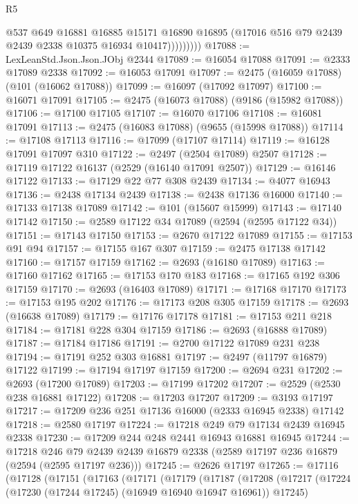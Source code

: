 \begin{lexlean}{R5}
\begin{coremodule}
                    @537
                    @649
                    @16881
                    @16885
                    @15171
                    @16890
                    @16895
                    (@17016 @516 @79 @2439 @2439 @2338 @10375 @16934 @10417)))))))))
@17088 := LexLeanStd.Json.Json.JObj @2344
@17089 := @16054 @17088
@17091 := @2333 @17089 @2338
@17092 := @16053 @17091
@17097 := @2475 (@16059 @17088) (@101 (@16062 @17088))
@17099 := @16097 (@17092 @17097)
@17100 := @16071 @17091
@17105 := @2475 (@16073 @17088) (@9186 (@15982 @17088))
@17106 := @17100 @17105
@17107 := @16070 @17106
@17108 := @16081 @17091
@17113 := @2475 (@16083 @17088) (@9655 (@15998 @17088))
@17114 := @17108 @17113
@17116 := @17099 (@17107 @17114)
@17119 := @16128 @17091 @17097 @310
@17122 := @2497 (@2504 @17089) @2507
@17128 := @17119 @17122 @16137 (@2529 (@16140 @17091 @2507))
@17129 := @16146 @17122
@17133 := @17129 @22 @77 @308 @2439
@17134 := @4077 @16943
@17136 := @2438 @17134 @2439
@17138 := @2438 @17136 @16000
@17140 := @17133 @17138 @17089
@17142 := @101 (@15607 @15999)
@17143 := @17140 @17142
@17150 := @2589 @17122 @34 @17089 (@2594 (@2595 @17122 @34))
@17151 := @17143 @17150
@17153 := @2670 @17122 @17089
@17155 := @17153 @91 @94
@17157 := @17155 @167 @307
@17159 := @2475 @17138 @17142
@17160 := @17157 @17159
@17162 := @2693 (@16180 @17089)
@17163 := @17160 @17162
@17165 := @17153 @170 @183
@17168 := @17165 @192 @306 @17159
@17170 := @2693 (@16403 @17089)
@17171 := @17168 @17170
@17173 := @17153 @195 @202
@17176 := @17173 @208 @305 @17159
@17178 := @2693 (@16638 @17089)
@17179 := @17176 @17178
@17181 := @17153 @211 @218
@17184 := @17181 @228 @304 @17159
@17186 := @2693 (@16888 @17089)
@17187 := @17184 @17186
@17191 := @2700 @17122 @17089 @231 @238
@17194 := @17191 @252 @303 @16881
@17197 := @2497 (@11797 @16879) @17122
@17199 := @17194 @17197 @17159
@17200 := @2694 @231
@17202 := @2693 (@17200 @17089)
@17203 := @17199 @17202
@17207 := @2529 (@2530 @238 @16881 @17122)
@17208 := @17203 @17207
@17209 := @3193 @17197
@17217 := @17209 @236 @251 @17136 @16000 (@2333 @16945 @2338) @17142
@17218 := @2580 @17197
@17224 := @17218 @249 @79 @17134 @2439 @16945 @2338
@17230 := @17209 @244 @248 @2441 @16943 @16881 @16945
@17244 := @17218
    @246
    @79
    @2439
    @2439
    @16879
    @2338
    (@2589 @17197 @236 @16879 (@2594 (@2595 @17197 @236)))
@17245 := @2626 @17197
@17265 := @17116
    (@17128
      (@17151
        (@17163
          (@17171
            (@17179
              (@17187
                (@17208
                  (@17217
                    (@17224 (@17230 (@17244 @17245) (@16949 @16940 @16947 @16961)) @17245)

\end{coremodule}
\end{lexlean}
